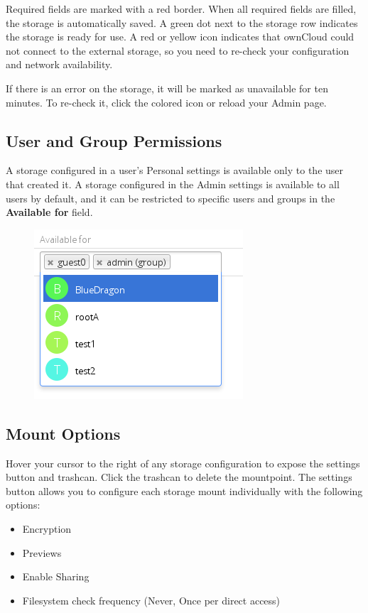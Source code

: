 \documentclass[letterpaper,10pt,english]{sphinxmanual}
\begin{document}
Required fields are marked with a red border. When all required fields are
filled, the storage is automatically saved. A green dot next to the storage row
indicates the storage is ready for use. A red or yellow icon indicates
that ownCloud could not connect to the external storage, so you need to
re-check your configuration and network availability.

If there is an error on the storage, it will be marked as unavailable for ten
minutes. To re-check it, click the colored icon or reload your Admin page.


\subsection{User and Group Permissions}
\label{configuration_files/external_storage_configuration_gui:user-and-group-permissions}
A storage configured in a user's Personal settings is available only to the user
that created it. A storage configured in the Admin settings is available to
all users by default, and it can be restricted to specific users and groups in
the \textbf{Available for} field.
\begin{figure}[htbp]
\centering

\includegraphics{applicable.png}
\end{figure}


\subsection{Mount Options}
\label{configuration_files/external_storage_configuration_gui:external-storage-mount-options-label}\label{configuration_files/external_storage_configuration_gui:mount-options}
Hover your cursor to the right of any storage configuration to expose
the settings button and trashcan. Click the trashcan to delete the
mountpoint. The settings button allows you to configure each storage mount
individually with the following options:
\begin{itemize}
\item {} 
Encryption

\item {} 
Previews

\item {} 
Enable Sharing

\item {} 
Filesystem check frequency (Never, Once per direct access)

\end{itemize}
\end{document}
